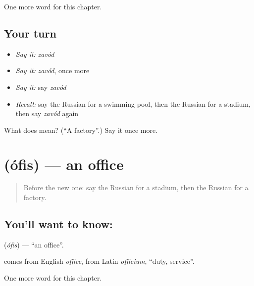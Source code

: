 \begin{grammarlens}[title={What you've built}]
One more word for this chapter.
\end{grammarlens}

\subsection*{Your turn}
\begin{itemize}
\raggedright
  \item \emph{Say it:} \emph{zavód}
  \item \emph{Say it:} \emph{zavód}, once more
  \item \emph{Say it:} say \emph{zavód}
  \item \emph{Recall:} say the Russian for a swimming pool, then the Russian for a stadium, then say \emph{zavód} again
\end{itemize}

\begin{tcolorbox}[breakable,colback=teal!4,colframe=teal!35!black,title={Before you move on}]
What does  mean? (\textquotedblleft{}A factory\textquotedblright{}.) Say it once more.
\end{tcolorbox}
\section[\texorpdfstring{\ru{офис} (ófis)}{офис (ófis)}]{ (ófis) — an office}

\label{lesson:RU-C89-office}



\begin{quote}
Before the new one: say the Russian for a stadium, then the Russian for a factory.
\end{quote}

\subsection*{You'll want to know: }
\textbf{} (\emph{ófis}) — \textquotedblleft{}an office\textquotedblright{}.

\begin{cousinweb}
\textbf{} comes from English \emph{office}, from Latin \emph{officium}, \textquotedblleft{}duty, service\textquotedblright{}.
\end{cousinweb}

\begin{grammarlens}[title={What you've built}]
One more word for this chapter.
\end{grammarlens}

